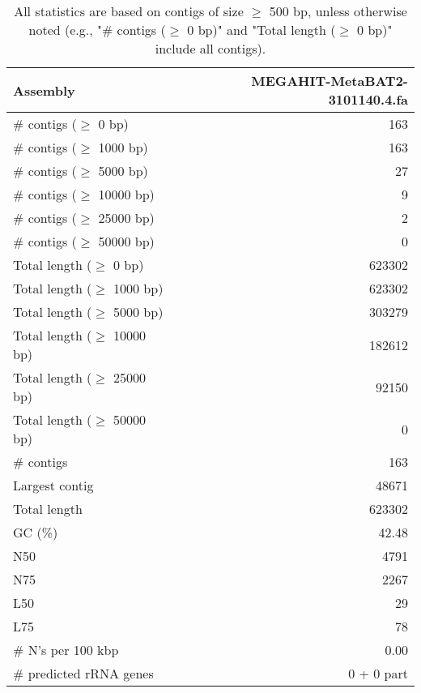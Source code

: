 \documentclass[12pt,a4paper]{article}
\begin{document}
\begin{table}[ht]
\begin{center}
\caption{All statistics are based on contigs of size $\geq$ 500 bp, unless otherwise noted (e.g., "\# contigs ($\geq$ 0 bp)" and "Total length ($\geq$ 0 bp)" include all contigs).}
\begin{tabular}{|l*{1}{|r}|}
\hline
Assembly & MEGAHIT-MetaBAT2-3101140.4.fa \\ \hline
\# contigs ($\geq$ 0 bp) & 163 \\ \hline
\# contigs ($\geq$ 1000 bp) & 163 \\ \hline
\# contigs ($\geq$ 5000 bp) & 27 \\ \hline
\# contigs ($\geq$ 10000 bp) & 9 \\ \hline
\# contigs ($\geq$ 25000 bp) & 2 \\ \hline
\# contigs ($\geq$ 50000 bp) & 0 \\ \hline
Total length ($\geq$ 0 bp) & 623302 \\ \hline
Total length ($\geq$ 1000 bp) & 623302 \\ \hline
Total length ($\geq$ 5000 bp) & 303279 \\ \hline
Total length ($\geq$ 10000 bp) & 182612 \\ \hline
Total length ($\geq$ 25000 bp) & 92150 \\ \hline
Total length ($\geq$ 50000 bp) & 0 \\ \hline
\# contigs & 163 \\ \hline
Largest contig & 48671 \\ \hline
Total length & 623302 \\ \hline
GC (\%) & 42.48 \\ \hline
N50 & 4791 \\ \hline
N75 & 2267 \\ \hline
L50 & 29 \\ \hline
L75 & 78 \\ \hline
\# N's per 100 kbp & 0.00 \\ \hline
\# predicted rRNA genes & 0 + 0 part \\ \hline
\end{tabular}
\end{center}
\end{table}
\end{document}
